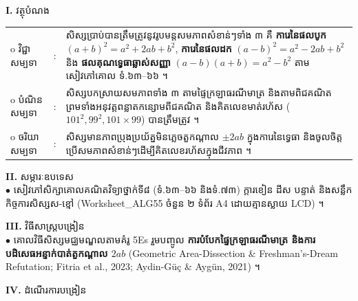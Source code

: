 \documentclass[a4paper,10pt]{article}
\newcommand{\wcirc}{{\CourierBullet\fontsize{9.5pt}{11pt}\selectfont o}}
\newcommand{\en}[1]{{\TimesEn #1}}
\begin{document}
\textbf{I.} {\muol វត្ថុបំណង}\\[1pt]
\hspace*{0.55cm}%
\begin{tabular}{@{}l l L{14.2cm}@{}}
  \wcirc \hspace{0.25cm} វិជ្ជាសម្បទា & : & សិស្សប្រាប់បានត្រឹមត្រូវនូវរូបមន្តសមភាពសំខាន់ៗទាំង ៣ គឺ \textbf{ការេនៃផលបូក} $(a+b)^2 = a^2+2ab+b^2$, \textbf{ការេនៃផលដក} $(a-b)^2 = a^2-2ab+b^2$ និង \textbf{ផលគុណទ្វេធាឆ្លាស់សញ្ញា} $(a-b)(a+b) = a^2-b^2$ តាមសៀវភៅគោល ទំ.៦៣--៦៦ ។ \\
  \wcirc \hspace{0.25cm} បំណិនសម្បទា & : & សិស្សបកស្រាយសមភាពទាំង ៣ តាមផ្ទៃក្រឡាធរណីមាត្រ និងតាមពិជគណិត ព្រមទាំងអនុវត្តពន្លាតកន្សោមពីជគណិត និងគិតលេខមាត់រហ័ស ($101^2, 99^2, 101\times 99$) បានត្រឹមត្រូវ ។ \\
  \wcirc \hspace{0.25cm} ចរិយាសម្បទា & : & សិស្សមានភាពប្រុងប្រយ័ត្នមិនភ្លេចតួកណ្ដាល $\pm 2ab$ ក្នុងការេនៃទ្វេធា និងចូលចិត្តប្រើសមភាពសំខាន់ៗដើម្បីគិតលេខរហ័សក្នុងជីវភាព ។ \\
\end{tabular}

\vspace{1pt}

\textbf{II.} {\muol សម្ភារៈឧបទេស}\\[1pt]
\hspace*{0.55cm}$\bullet$ \hspace{0.35cm} សៀវភៅសិក្សាគោលគណិតវិទ្យាថ្នាក់ទី៨ (ទំ.៦៣--៦៦ និងទំ.៧៣) ក្ដារខៀន ដីស បន្ទាត់ និងសន្លឹកកិច្ចការសិស្សស-ខ្មៅ (\en{Worksheet\_ALG55} ចំនួន ២ ទំព័រ \en{A4} ដោយគ្មានស្លាយ \en{LCD}) ។

\vspace{1pt}

\textbf{III.} {\muol វិធីសាស្រ្តបង្រៀន}\\[1pt]
\hspace*{0.55cm}$\bullet$ \hspace{0.35cm} គោលវិធីសិស្សមជ្ឈមណ្ឌលតាមគំរូ \en{5Es} រួមបញ្ចូល \textbf{ការបំបែកផ្ទៃក្រឡាធរណីមាត្រ និងការបដិសេធអន្ទាក់បាត់តួកណ្ដាល $2ab$} (\en{Geometric Area-Dissection \& Freshman's-Dream Refutation}; \en{Fitria et al., 2023; Aydin-G\"u\c{c} \& Ayg\"un, 2021}) ។

\vspace{2pt}

\textbf{IV.} {\muol ដំណើរការបង្រៀន}\\[-6pt]
\end{document}
